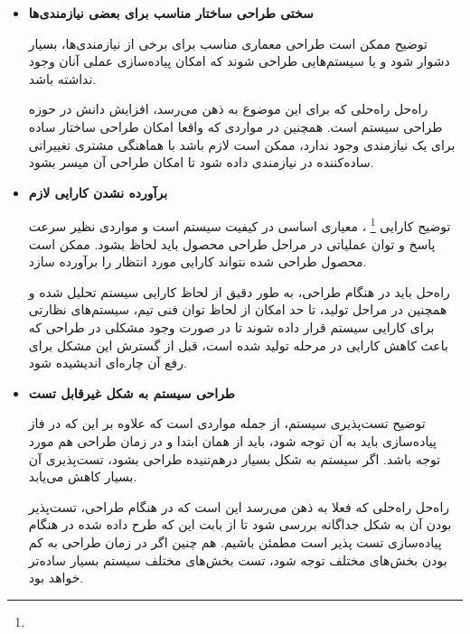 \begin{itemize}
	\item 
	\textbf{سختی طراحی ساختار مناسب برای بعضی نیازمندی‌ها}
	
	توضیح \hspace*{1cm} 
	ممکن است طراحی معماری مناسب برای برخی از نیازمندی‌ها، بسیار دشوار شود و یا سیستم‌هایی طراحی شوند که امکان پیاده‌سازی عملی آنان وجود نداشته باشد.
	
		
	راه‌حل \hspace*{1cm} 
	راه‌حلی که برای این موضوع به ذهن می‌رسد، افزایش دانش در حوزه طراحی سیستم است. همچنین در مواردی که واقعا امکان طراحی ساختار ساده برای یک نیازمندی وجود ندارد، ممکن است لازم باشد با هماهنگی مشتری تغییراتی ساده‌کننده در نیازمندی داده شود تا امکان طراحی آن میسر بشود.

	
	
		\item 
	\textbf{برآورده نشدن کارایی لازم}
	
	
		توضیح \hspace*{1cm} 
	کارایی
	\footnote{}
	، 
	 معیاری اساسی در کیفیت سیستم است و مواردی نظیر سرعت پاسخ و توان عملیاتی در مراحل طراحی محصول باید لحاظ بشود. ممکن است محصول طراحی شده نتواند کارایی مورد انتظار را برآورده سازد.
	
	راه‌حل \hspace*{1cm} 
	باید در هنگام طراحی، به طور دقیق از لحاظ کارایی سیستم تحلیل شده و همچنین در مراحل تولید، تا حد امکان از لحاظ توان فنی تیم، سیستم‌های نظارتی برای کارایی سیستم قرار داده شوند تا در صورت وجود مشکلی در طراحی که باعث کاهش کارایی در مرحله تولید شده است، قبل از گسترش این مشکل برای رفع آن چاره‌ای اندیشیده شود.
	
	\item
	\textbf{طراحی سیستم به شکل غیرقابل تست}
	
	توضیح \hspace*{1cm} 
	تست‌پذیری سیستم، از جمله مواردی است که علاوه بر این که در فاز پیاده‌سازی باید به آن توجه شود، باید از همان ابتدا و در زمان طراحی هم مورد توجه باشد. اگر سیستم به شکل بسیار در‌هم‌تنیده طراحی بشود، تست‌پذیری آن بسیار کاهش می‌یابد.
	
	
	راه‌حل \hspace*{1cm} 
	راه‌حلی که فعلا به ذهن می‌رسد این است که در هنگام طراحی، تست‌پذیر بودن آن به شکل جداگانه بررسی شود تا از بابت این که طرح داده شده در هنگام پیاده‌سازی تست پذیر است مطمئن باشیم. هم چنین اگر در زمان طراحی به کم بودن
	بخش‌های مختلف توجه شود، تست بخش‌های مختلف سیستم بسیار ساده‌تر خواهد بود.
	
\end{itemize}

